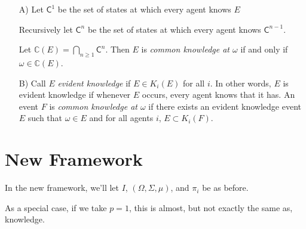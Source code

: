 \begin{enumerate}
	\item[A)] Let $\mathsf{C}^1$ be the set of states at which every agent knows $E$
	
	 Recursively let $\mathsf{C}^n$ be the set of states at which every agent knows $\mathsf{C}^{n-1}$.
	
	Let $\mathbb{C} (E)=\bigcap\limits_{n\geq 1}\mathsf{C}^n$.  Then $E$ is \textit{common knowledge at $\mathit{\omega}$} if and only if $\omega\in \mathbb{C}(E)$.\\
	
	\item[B)] Call $E$ \textit{evident knowledge} if $E\in K_i(E)$ for all $i$.  In other words, $E$ is evident knowledge if whenever $E$ occurs, every agent knows that it has.  An event $F$ is \textit{common knowledge at $\mathit{\omega}$} if there exists an evident knowledge event $E$ such that $\omega\in E$ and for all agents $i$, $E\subset K_i(F)$.
\end{enumerate}

\section*{New Framework}

In the new framework, we'll let $I$, $(\Omega,\Sigma,\mu)$, and $\pi_i$ be as before.


As a special case, if we take $p=1$, this is almost, but not exactly the same as, knowledge.

